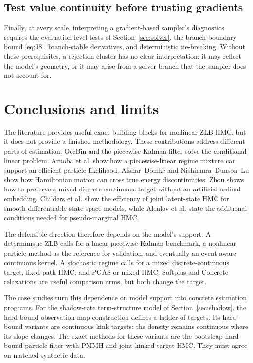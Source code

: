 \documentclass[11pt]{article}
\begin{document}
\subsection*{Test value continuity before trusting gradients}

Finally, at every scale, interpreting a gradient-based sampler's diagnostics
requires the evaluation-level tests of Section~\ref{sec:solver}, the branch-boundary
bound \eqref{eq:98}, branch-stable derivatives, and deterministic tie-breaking.
Without these prerequisites, a rejection cluster has no clear interpretation:
it may reflect the model's geometry, or it may arise from a solver branch that
the sampler does not account for.

\section{Conclusions and limits}
\label{sec:conclusion}

The literature provides useful exact building blocks for nonlinear-ZLB HMC,
but it does not provide a finished methodology. These contributions address
different parts of estimation. OccBin and the piecewise Kalman filter solve
the conditional linear problem. Aruoba et al. show how a piecewise-linear
regime mixture can support an efficient particle likelihood. Afshar--Domke
and Nishimura--Dunson--Lu show how Hamiltonian motion can cross true energy
discontinuities. Zhou shows how to preserve a mixed discrete-continuous target
without an artificial ordinal embedding. Childers et al. show the efficiency
of joint latent-state HMC for smooth differentiable state-space models, while
Alenl\"ov et al. state the additional conditions needed for pseudo-marginal
HMC.

The defensible direction therefore depends on the model's support. A
deterministic ZLB calls for a linear piecewise-Kalman benchmark, a nonlinear
particle method as the reference for validation, and eventually an event-aware
continuous kernel. A stochastic regime calls for a mixed discrete-continuous
target, fixed-path HMC, and PGAS or mixed HMC. Softplus and Concrete relaxations
are useful comparison arms, but both change the target.

The case studies turn this dependence on model support into concrete
estimation programs. For the shadow-rate term-structure model of
Section~\ref{sec:shadow}, the hard-bound observation-map construction defines a ladder
of targets. Its hard-bound variants are continuous kink targets: the density
remains continuous where its slope changes. The exact methods for these
variants are the bootstrap hard-bound particle filter with PMMH and joint
kinked-target HMC. They must agree on matched synthetic data.
\end{document}
